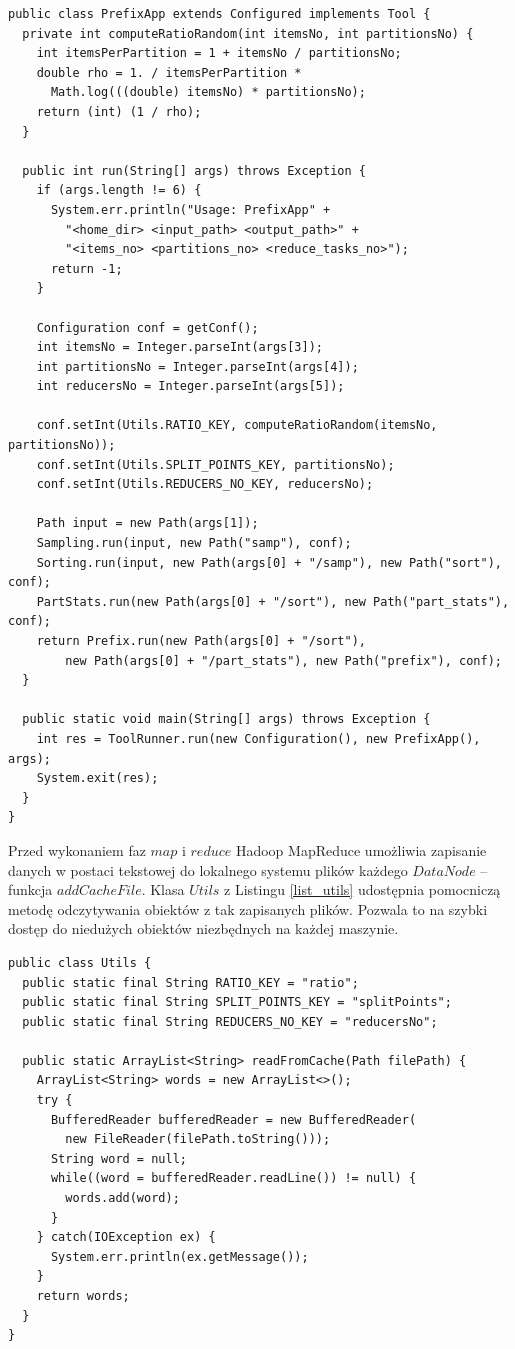 \documentclass[magisterska]{pracamgr}
\begin{document}
\begin{lstlisting}[language=SmallJava,firstnumber=1,label=list_run_prefix_app,caption=Uruchamianie algorytmu]
public class PrefixApp extends Configured implements Tool {
  private int computeRatioRandom(int itemsNo, int partitionsNo) {
    int itemsPerPartition = 1 + itemsNo / partitionsNo;
    double rho = 1. / itemsPerPartition *
      Math.log(((double) itemsNo) * partitionsNo);
    return (int) (1 / rho);
  }

  public int run(String[] args) throws Exception {
    if (args.length != 6) {
      System.err.println("Usage: PrefixApp" +
        "<home_dir> <input_path> <output_path>" +
        "<items_no> <partitions_no> <reduce_tasks_no>");
      return -1;
    }

    Configuration conf = getConf();
    int itemsNo = Integer.parseInt(args[3]);
    int partitionsNo = Integer.parseInt(args[4]);
    int reducersNo = Integer.parseInt(args[5]);
    
    conf.setInt(Utils.RATIO_KEY, computeRatioRandom(itemsNo, partitionsNo));
    conf.setInt(Utils.SPLIT_POINTS_KEY, partitionsNo);
    conf.setInt(Utils.REDUCERS_NO_KEY, reducersNo);
    
    Path input = new Path(args[1]);
    Sampling.run(input, new Path("samp"), conf);
    Sorting.run(input, new Path(args[0] + "/samp"), new Path("sort"), conf);
    PartStats.run(new Path(args[0] + "/sort"), new Path("part_stats"), conf);
    return Prefix.run(new Path(args[0] + "/sort"),
        new Path(args[0] + "/part_stats"), new Path("prefix"), conf);
  }

  public static void main(String[] args) throws Exception {
    int res = ToolRunner.run(new Configuration(), new PrefixApp(), args);
    System.exit(res);
  }
}
\end{lstlisting}

\newpage
Przed wykonaniem faz \(map\) i \(reduce\) Hadoop MapReduce umożliwia zapisanie danych w postaci tekstowej do lokalnego systemu plików każdego \(DataNode\) -- funkcja \(addCacheFile\). Klasa \(Utils\) z Listingu \ref{list_utils} udostępnia pomocniczą metodę odczytywania obiektów z tak zapisanych plików. Pozwala to na szybki dostęp do niedużych obiektów niezbędnych na każdej maszynie.

\begin{lstlisting}[language=SmallJava,firstnumber=1,label=list_utils,caption=Metody pomocniczne]
public class Utils {
  public static final String RATIO_KEY = "ratio";
  public static final String SPLIT_POINTS_KEY = "splitPoints";
  public static final String REDUCERS_NO_KEY = "reducersNo";

  public static ArrayList<String> readFromCache(Path filePath) {
    ArrayList<String> words = new ArrayList<>();
    try {
      BufferedReader bufferedReader = new BufferedReader(
        new FileReader(filePath.toString()));
      String word = null;
      while((word = bufferedReader.readLine()) != null) {
        words.add(word);
      }
    } catch(IOException ex) {
      System.err.println(ex.getMessage());
    }
    return words;
  }
}
\end{lstlisting}
\end{document}
